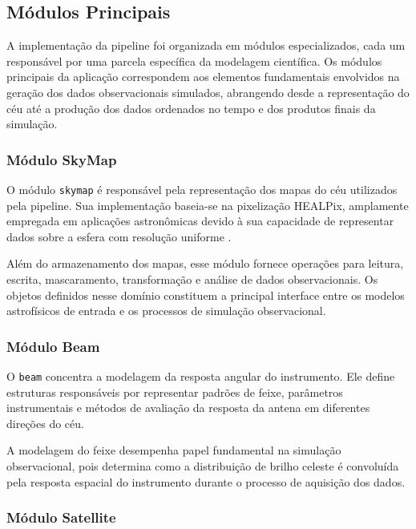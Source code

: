 \subsection{Módulos Principais}

A implementação da pipeline foi organizada em módulos especializados, cada um responsável por uma parcela específica da modelagem científica. Os módulos principais da aplicação correspondem aos elementos fundamentais envolvidos na geração dos dados observacionais simulados, abrangendo desde a representação do céu até a produção dos dados ordenados no tempo e dos produtos finais da simulação.


\subsubsection{Módulo SkyMap}

O módulo \texttt{skymap} é responsável pela representação dos mapas do céu utilizados pela pipeline. Sua implementação baseia-se na pixelização HEALPix, amplamente empregada em aplicações astronômicas devido à sua capacidade de representar dados sobre a esfera com resolução uniforme \cite{gorski2005healpix}.

Além do armazenamento dos mapas, esse módulo fornece operações para leitura, escrita, mascaramento, transformação e análise de dados observacionais. Os objetos definidos nesse domínio constituem a principal interface entre os modelos astrofísicos de entrada e os processos de simulação observacional.

\subsubsection{Módulo Beam}

O \texttt{beam} concentra a modelagem da resposta angular do instrumento. Ele define estruturas responsáveis por representar padrões de feixe, parâmetros instrumentais e métodos de avaliação da resposta da antena em diferentes direções do céu.

A modelagem do feixe desempenha papel fundamental na simulação observacional, pois determina como a distribuição de brilho celeste é convoluída pela resposta espacial do instrumento durante o processo de aquisição dos dados.

\subsubsection{Módulo Satellite}

